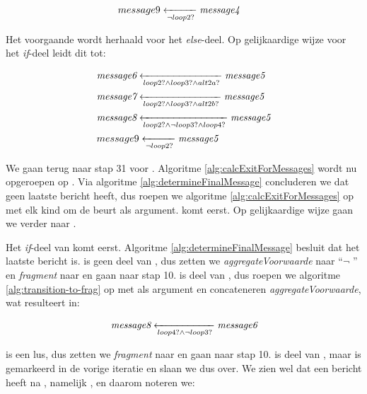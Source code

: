 \begin{align*}
	&\transitionentry[\fragmessage{message4}]{\lnot \fragcond{loop2}}{message9}
\end{align*}

Het voorgaande wordt herhaald voor het \textit{else}-deel. Op gelijkaardige wijze voor het \textit{if}-deel leidt dit tot:

\begin{align*}
	&\transitionentry[\fragmessage{message5}]{\fragcond{loop2} \land \fragcond{loop3} \land \fragcond{alt2a}}{\fragmessage{message6}} \\
	&\transitionentry[\fragmessage{message5}]{\fragcond{loop2} \land \fragcond{loop3} \land \fragcond{alt2b}}{\fragmessage{message7}} \\
	&\transitionentry[\fragmessage{message5}]{\fragcond{loop2} \land \lnot \fragcond{loop3} \land \fragcond{loop4}}{\fragmessage{message8}} \\
	&\transitionentry[\fragmessage{message5}]{\lnot \fragcond{loop2}}{message9}
\end{align*}

We gaan terug naar stap 31 voor . Algoritme \ref{alg:calcExitForMessages} wordt nu opgeroepen op . Via algoritme \ref{alg:determineFinalMessage} concluderen we dat  geen laatste bericht heeft, dus roepen we algoritme \ref{alg:calcExitForMessages} op met elk kind om de beurt als argument.  komt eerst. Op gelijkaardige wijze gaan we verder naar .

Het \textit{if}-deel van  komt eerst. Algoritme \ref{alg:determineFinalMessage} besluit dat  het laatste bericht is.  is geen deel van , dus zetten we \textit{aggregateVoorwaarde} naar ``$\lnot$ '' en \textit{fragment} naar  en gaan naar stap 10.  is deel van , dus roepen we algoritme \ref{alg:transition-to-frag} op met  als argument en concateneren \textit{aggregateVoorwaarde}, wat resulteert in:

\begin{align*}
	\transitionentry[\fragmessage{message6}]{\fragcond{loop4} \land \lnot \fragcond{loop3}}{\fragmessage{message8}}
\end{align*}

 is een lus, dus zetten we \textit{fragment} naar  en gaan naar stap 10.  is deel van , maar  is gemarkeerd in de vorige iteratie en slaan we dus over. We zien wel dat  een bericht heeft na , namelijk , en daarom noteren we:

